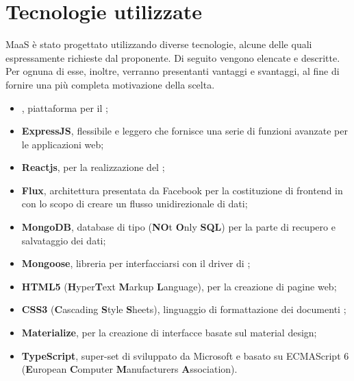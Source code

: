\section{Tecnologie utilizzate}
MaaS \`e stato progettato utilizzando diverse tecnologie, alcune delle quali espressamente richieste dal proponente. Di seguito vengono elencate e descritte. Per ognuna di esse, inoltre, verranno presentanti vantaggi e svantaggi, al fine di fornire una pi\`u completa motivazione della scelta.
\begin{itemize}
\item \textbf{}, piattaforma per il ;
\item \textbf{ExpressJS},   flessibile e leggero che fornisce una serie di funzioni avanzate per le applicazioni web;
\item \textbf{Reactjs},   per la realizzazione del ;
\item \textbf{Flux}, architettura presentata da Facebook per la costituzione di frontend in  con lo scopo di creare un flusso unidirezionale di dati;
\item \textbf{MongoDB}, database di tipo  (\textbf{NO}t \textbf{O}nly \textbf{SQL}) per la parte di recupero e salvataggio dei dati;
\item \textbf{Mongoose}, libreria per interfacciarsi con il driver di ;
\item \textbf{HTML5} (\textbf{H}yper\textbf{T}ext \textbf{M}arkup \textbf{L}anguage),  per la creazione di pagine web;
\item \textbf{CSS3} (\textbf{C}ascading \textbf{S}tyle \textbf{S}heets), linguaggio di formattazione dei documenti ;
\item \textbf{Materialize},   per la creazione di interfacce basate sul material design;
\item \textbf{TypeScript}, super-set di  sviluppato da Microsoft e basato su ECMAScript 6 (\textbf{E}uropean \textbf{C}omputer \textbf{M}anufacturers \textbf{A}ssociation).
\end{itemize}


